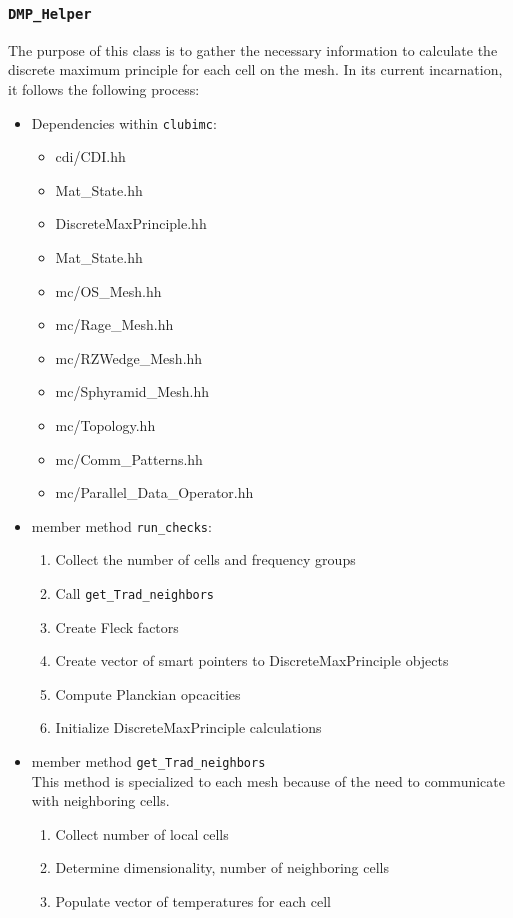 \subsubsection{\texttt{DMP\_Helper}}
The purpose of this class is to gather the necessary information to calculate
the discrete maximum principle for each cell on the mesh.  In its current
incarnation, it follows the following process:
\begin{itemize}
 \item Dependencies within \texttt{clubimc}:
    \begin{itemize}
	\item cdi/CDI.hh
	\item Mat\_State.hh
	\item DiscreteMaxPrinciple.hh
	\item Mat\_State.hh
	\item mc/OS\_Mesh.hh
	\item mc/Rage\_Mesh.hh
	\item mc/RZWedge\_Mesh.hh
	\item mc/Sphyramid\_Mesh.hh
	\item mc/Topology.hh
	\item mc/Comm\_Patterns.hh
	\item mc/Parallel\_Data\_Operator.hh
    \end{itemize}
 \item member method \texttt{run\_checks}:
     \begin{enumerate}
	\item Collect the number of cells and frequency groups
	\item Call \texttt{get\_Trad\_neighbors}
	\item Create Fleck factors
	\item Create vector of smart pointers to DiscreteMaxPrinciple objects
	\item Compute Planckian opcacities
	\item Initialize DiscreteMaxPrinciple calculations
     \end{enumerate}
 \item member method \texttt{get\_Trad\_neighbors} \\
	This method is specialized to each mesh because of the need to
communicate with neighboring cells.
	\begin{enumerate}
	\item Collect number of local cells
	\item Determine dimensionality, number of neighboring cells
	\item Populate vector of temperatures for each cell
	\end{enumerate}
\end{itemize}


